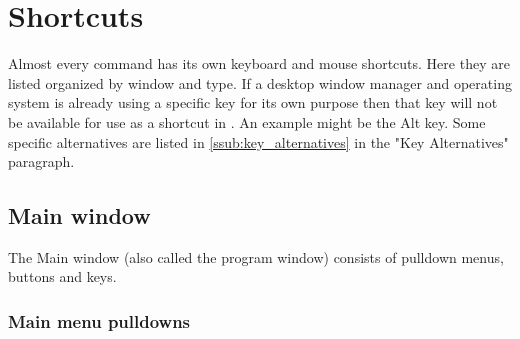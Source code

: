 \chapter{Shortcuts}%
\label{cha:shortcuts}

Almost every \CGGI{} command has its own keyboard and mouse shortcuts. Here
they are listed organized by window and type.  If a desktop window manager and operating
system is already using a specific key for its own purpose then that key will not be available
for use as a shortcut in \CGG{}. An example might be the Alt key. Some specific alternatives
are listed in \ref{ssub:key_alternatives} in the "Key Alternatives" paragraph.

\section{Main window }%
\label{sec:main_window}

The Main window (also called the program window) consists of pulldown menus, buttons and keys.

\subsection*{Main menu pulldowns}%
\label{sub:main_menu_pulldowns}

\renewcommand{\arraystretch}{1.15}%

